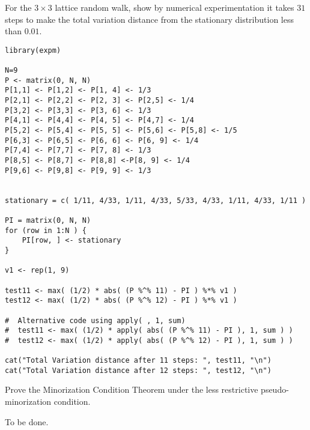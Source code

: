 \documentclass[12pt]{article}
\begin{document}
  \begin{exercise}
    For the $3 \times 3$ lattice random walk, show
    by numerical
    experimentation it takes \( 31 \) steps to make the total variation
    distance from the stationary distribution less than \( 0.01 \).
  \end{exercise}
  \begin{solution}
\begin{verbatim}
library(expm)

N=9
P <- matrix(0, N, N)
P[1,1] <- P[1,2] <- P[1, 4] <- 1/3
P[2,1] <- P[2,2] <- P[2, 3] <- P[2,5] <- 1/4
P[3,2] <- P[3,3] <- P[3, 6] <- 1/3
P[4,1] <- P[4,4] <- P[4, 5] <- P[4,7] <- 1/4
P[5,2] <- P[5,4] <- P[5, 5] <- P[5,6] <- P[5,8] <- 1/5
P[6,3] <- P[6,5] <- P[6, 6] <- P[6, 9] <- 1/4
P[7,4] <- P[7,7] <- P[7, 8] <- 1/3
P[8,5] <- P[8,7] <- P[8,8] <-P[8, 9] <- 1/4
P[9,6] <- P[9,8] <- P[9, 9] <- 1/3


stationary = c( 1/11, 4/33, 1/11, 4/33, 5/33, 4/33, 1/11, 4/33, 1/11 )

PI = matrix(0, N, N)
for (row in 1:N ) {
    PI[row, ] <- stationary
}

v1 <- rep(1, 9)

test11 <- max( (1/2) * abs( (P %^% 11) - PI ) %*% v1 )
test12 <- max( (1/2) * abs( (P %^% 12) - PI ) %*% v1 )

#  Alternative code using apply( , 1, sum)
#  test11 <- max( (1/2) * apply( abs( (P %^% 11) - PI ), 1, sum ) )
#  test12 <- max( (1/2) * apply( abs( (P %^% 12) - PI ), 1, sum ) )

cat("Total Variation distance after 11 steps: ", test11, "\n")
cat("Total Variation distance after 12 steps: ", test12, "\n")
\end{verbatim}
  \end{solution}

\begin{exercise}
    Prove the Minorization Condition Theorem under the less restrictive
    pseudo-minorization condition.
\end{exercise}
\begin{solution}
    To be done.
\end{solution}
\end{document}
